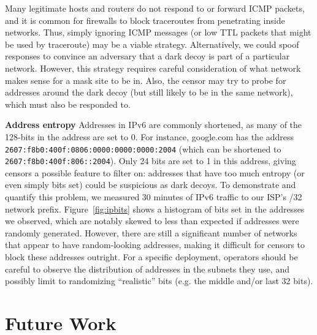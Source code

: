 \documentclass[letterpaper,twocolumn,10pt]{article}
\renewcommand{\paragraph}[1]{\smallskip\noindent\textbf{#1\quad}}
\begin{document}
Many legitimate hosts and routers do not respond to or forward ICMP packets, and
it is common for firewalls to block traceroutes from penetrating inside
networks. Thus, simply ignoring ICMP messages (or low TTL packets that might be
used by traceroute) may be a viable strategy. %
Alternatively, we could spoof responses to convince an adversary that a dark
decoy is part of a particular network. However, this strategy requires careful
consideration of what network makes sense for a mask site to be in. Also, the
censor may try to probe for addresses around the dark decoy (but still likely to
be in the same network), which must also be responded to.




\FigIpBits

\paragraph{Address entropy}
Addresses in IPv6 are commonly shortened, as many of the 128-bits in the address are set to 0.
For instance, google.com has the address
\texttt{2607:f8b0:400f:0806:0000:0000:0000:2004} (which can be shortened to
\texttt{2607:f8b0:400f:806::2004}). Only 24 bits are set to 1 in this address,
giving censors a possible feature to filter on: addresses that have too much
entropy (or even simply bits set) could be suspicious as dark decoys. To demonstrate and quantify
this problem, we measured 30 minutes of IPv6 traffic to our ISP's /32 network prefix.
Figure~\ref{fig:ipbits} shows a histogram of bits set in the addresses we observed, which are
notably skewed to less than expected if addresses were randomly generated. However, there
are still a significant number of networks that appear to have random-looking addresses,
making it difficult for censors to block these addresses outright. For a specific deployment,
operators should be careful to observe the distribution of addresses in the subnets they use,
and possibly limit to randomizing ``realistic'' bits (e.g. the middle and/or last 32 bits).







\section{Future Work}
\end{document}
